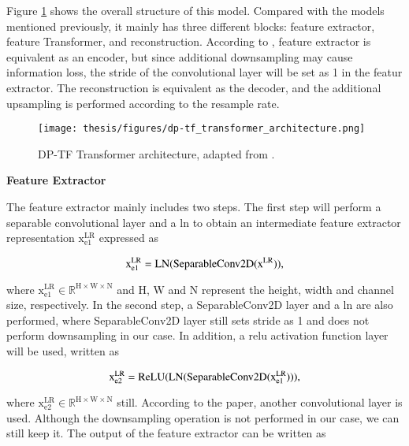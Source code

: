Figure \ref{dp-tf_transformer_architecture} shows the overall structure of this model. Compared with the models mentioned previously, it mainly has three different blocks: feature extractor, feature Transformer, and reconstruction. According to \cite{hinderer_blind_2022}, feature extractor is equivalent as an encoder, but since additional downsampling may cause information loss, the stride of the convolutional layer will be set as 1 in the featur extractor. The reconstruction is equivalent as the decoder, and the additional upsampling is performed according to the resample rate.

\begin{figure}
	\centering
	\texttt{[image: thesis/figures/dp-tf\_transformer\_architecture.png]}
	\caption{DP-TF Transformer architecture, adapted from \cite{hinderer_blind_2022}.}
	\label{dp-tf_transformer_architecture}
\end{figure}

\begin{spacing}{1.5}
\textbf{\large{Feature Extractor}}
\end{spacing}

The feature extractor mainly includes two steps. The first step will perform a separable convolutional layer and a \gls{ln} to obtain an intermediate feature extractor representation $\mathrm{x^{LR}_{e1}}$ expressed as

\begin{equation}
    \centering
    \mathrm{x^{LR}_{e1} = LN(SeparableConv2D(x^{LR}))},
    \label{first separable conv2D equation in feature extractor}
\end{equation}

where $\mathrm{x^{LR}_{e1} \in \mathbb{R}^{H\times W\times N}}$ and H, W and N represent the height, width and channel size, respectively. In the second step, a SeparableConv2D layer and a \gls{ln} are also performed, where SeparableConv2D layer still sets stride as 1 and does not perform downsampling in our case. In addition, a \gls{relu} activation function layer will be used, written as

\begin{equation}
    \centering
    \mathrm{x^{LR}_{e2} = ReLU(LN(SeparableConv2D(x^{LR}_{e1})))},
    \label{second conv block after first conv in feature extractor}
\end{equation}

where $\mathrm{x^{LR}_{e2} \in \mathbb{R}^{H\times W\times N}}$ still. According to the paper, another convolutional layer is used. Although the downsampling operation is not performed in our case, we can still keep it. The output of the feature extractor can be written as

